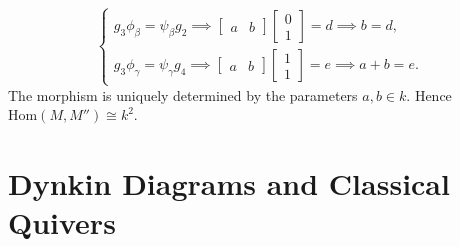 \documentclass[11pt, a4paper]{report}
\begin{document}
\begin{example}
\[\begin{cases}
g_3 \phi_\beta = \psi_\beta g_2 \implies \begin{bmatrix} a & b \end{bmatrix} \begin{bmatrix} 0 \\ 1 \end{bmatrix} = d \implies b = d, \\
g_3 \phi_\gamma = \psi_\gamma g_4 \implies \begin{bmatrix} a & b \end{bmatrix} \begin{bmatrix} 1 \\ 1 \end{bmatrix} = e \implies a + b = e.
\end{cases}
\]
The morphism is uniquely determined by the parameters $a, b \in k$. Hence $\mathrm{Hom}(M, M'') \cong k^2$.
\end{example}

\section{Dynkin Diagrams and Classical Quivers}
\end{document}
